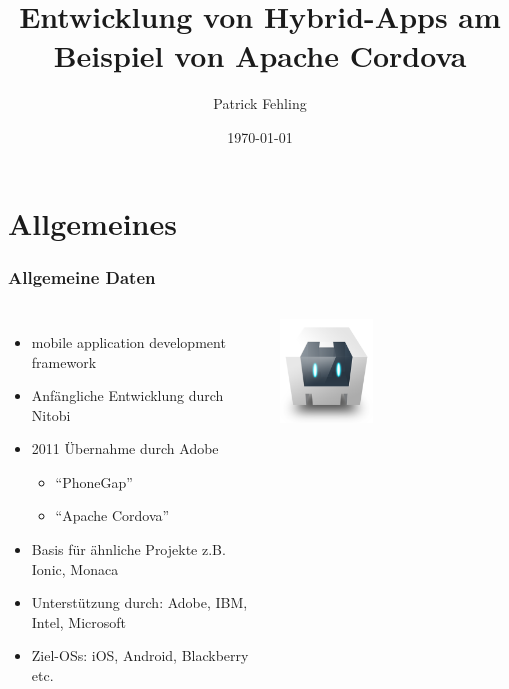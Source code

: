 \documentclass[xcolor=dvipsnames]{beamer}
\title[Entwicklung von Hybrid-Apps am Beispiel von Apache Cordova]{Entwicklung von Hybrid-Apps am Beispiel von Apache Cordova}
\author{Patrick Fehling}
\institute{Hochschule für Technik und Wirtschaft Berlin}
\date{\today}
\begin{document}
\maketitle
\frame{\tableofcontents}


\section{Allgemeines}

\begin{frame}\frametitle{Allgemeine Daten}
	\begin{columns}[t,onlytextwidth]
		\begin{itemize}
			\item mobile application development framework
			\item Anfängliche Entwicklung durch Nitobi
			\item 2011 Übernahme durch Adobe
			\begin{itemize}
				\item "`PhoneGap"'
				\item "`Apache Cordova"'
			\end{itemize}
			\item Basis für ähnliche Projekte z.B. Ionic, Monaca
			\item Unterstützung durch: Adobe, IBM, Intel, Microsoft
			\item Ziel-OSs: iOS, Android, Blackberry etc.
		\end{itemize}
		\centering
		
		\includegraphics[width=0.4\textwidth]{pictures/cordova_logo}
		

\end{columns}
\end{frame}
\end{document}
